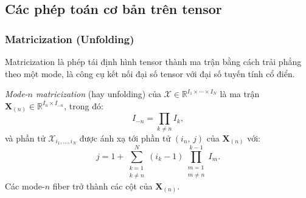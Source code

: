 \subsection{Các phép toán cơ bản trên tensor}

\subsubsection{Matricization (Unfolding)}

Matricization là phép tái định hình tensor thành ma trận bằng cách trải phẳng theo một mode, là công cụ kết nối đại số tensor với đại số tuyến tính cổ điển.

\begin{definition}
\textit{Mode-$n$ matricization} (hay unfolding) của $\mathcal{X} \in \mathbb{R}^{I_1 \times \cdots \times I_N}$ là ma trận $\mathbf{X}_{(n)} \in \mathbb{R}^{I_n \times I_{-n}}$, trong đó:
\begin{equation}
    I_{-n} = \prod_{k \neq n} I_k,
\end{equation}
và phần tử $\mathcal{X}_{i_1,\ldots,i_N}$ được ánh xạ tới phần tử $(i_n,\, j)$ của $\mathbf{X}_{(n)}$ với:
\begin{equation}
    j = 1 + \sum_{\substack{k=1\\k\neq n}}^{N} (i_k - 1) \prod_{\substack{m=1\\m\neq n}}^{k-1} I_m.
\end{equation}
Các mode-$n$ fiber trở thành các cột của $\mathbf{X}_{(n)}$.
\end{definition}


